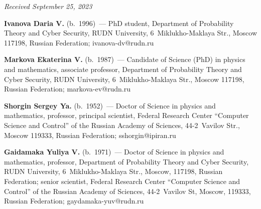 \hfill{\small\textit{Received September 25, 2023}} 


\Contr

\vspace*{-4pt}

\noindent
\textbf{Ivanova Daria V.} (b.\ 1996)~--- PhD student, Department of Probability 
Theory and Cyber Security, RUDN University, 6~Miklukho-Maklaya Str., Moscow 
117198, Russian Federation; \mbox{ivanova-dv@rudn.ru}

\vspace*{3pt}

\noindent
\textbf{Markova Ekaterina V.} (b.\ 1987)~--- Candidate of Science (PhD) in physics 
and mathematics, associate professor, Department of Probability Theory and Cyber 
Security, RUDN University, 6~Miklukho-Maklaya Str., Moscow 117198, Russian 
Federation; \mbox{markova-ev@rudn.ru}

\vspace*{3pt}

\noindent
\textbf{Shorgin Sergey Ya.} (b.\ 1952)~--- Doctor of Science in physics and 
mathematics, professor, principal scientist, 
Federal Research Center ``Computer Science and Control'' of the Russian Academy 
of Sciences, 44-2~Vavilov Str., Moscow 119333, Russian Federation; 
\mbox{sshorgin@ipiran.ru}

\vspace*{3pt}

\noindent
\textbf{Gaidamaka Yuliya V.} (b.\ 1971)~--- Doctor of Science in physics and 
mathematics, professor, Department of Probability Theory and Cyber Security, 
RUDN University, 6~Miklukho-Maklaya Str., Moscow, 117198, Russian Federation; 
senior scientist, Federal Research Center ``Computer Science and Control'' of the Russian Academy 
of Sciences, 44-2~Vavilov St, Moscow, 119333, Russian Federation; 
\mbox{gaydamaka-yuv@rudn.ru}


\label{end\stat}

\renewcommand{\bibname}{\protect\rm Литература} 